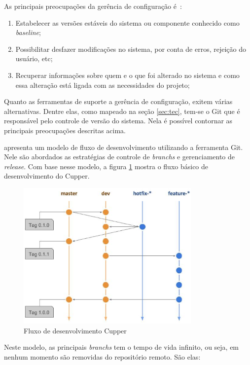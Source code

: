 As principais preocupações da gerência de configuração é~\cite{pressman:2009}:
\begin{enumerate}
  \item Estabelecer as versões estáveis do sistema ou componente conhecido
    como \textit{baseline};
  \item Possibilitar desfazer modificações no sistema, por conta de erros,
    rejeição do usuário, etc;
  \item Recuperar informações sobre quem e o que foi alterado no sistema e como
    essa alteração está ligada com as necessidades do projeto;
\end{enumerate}

Quanto as ferramentas de suporte a gerência de configuração, exitem várias alternativas.
Dentre elas, como mapeado na seção \ref{sec:tec}, tem-se o Git que é responsável pelo
controle de versão do sistema. Nela é possível contornar as principais preocupações
descritas acima.

 apresenta um modelo de fluxo de desenvolvimento utilizando a
ferramenta Git. Nele são abordados as estratégias de controle de \textit{branchs} e
gerenciamento de \textit{release}. Com base nesse modelo, a figura \ref{fig:ctrl_versao}
mostra o fluxo básico de desenvolvimento do Cupper.

\begin{figure}[h]
  \centering
  \includegraphics[width=0.8\textwidth]{figuras/controle_versao}
  \caption{Fluxo de desenvolvimento Cupper}
  \label{fig:ctrl_versao}
\end{figure}

Neste modelo, as principais \textit{branchs} tem o tempo de vida infinito, ou seja,
em nenhum momento são removidas do repositório remoto. São elas:

